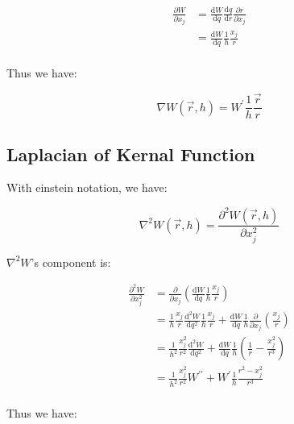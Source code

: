 \documentclass[10pt, oneside]{article}
\begin{document}
\begin{equation}
    \begin{aligned}
        \frac{\partial W}{\partial x_j}&=
        \frac{\mathrm{d} W}{\mathrm{d} q}\frac{\mathrm{d} q}{\mathrm{d} r}\frac{\partial r}{\partial x_j}\\
        &=\frac{\mathrm{d} W}{\mathrm{d} q}\frac{1}{h}\frac{x_j}{r}\\
    \end{aligned}
\end{equation}

Thus we have:

\begin{equation}
    \nabla W(\vec{r}, h) = W^\prime \frac{1}{h} \frac{\vec{r}}{r}
\end{equation}

\subsection{Laplacian of Kernal Function}

With einstein notation, we have:

\begin{equation}
    \nabla^2 W(\vec{r}, h) = \frac{\partial^2 W(\vec{r},h)}{\partial x_j^2}
\end{equation}

$\nabla^2 W$'s component is:

\begin{equation}
    \begin{aligned}
        \frac{\partial^2 W}{\partial x_j^2}&=\frac{\partial}{\partial x_j}
        \left(
            \frac{\mathrm{d} W}{\mathrm{d} q}\frac{1}{h}\frac{x_j}{r}
        \right)\\
        &=\frac{1}{h}\frac{x_j}{r}\frac{\mathrm{d}^2 W}{\mathrm{d} q^2}\frac{1}{h}\frac{x_j}{r}+
        \frac{\mathrm{d} W}{\mathrm{d} q}\frac{1}{h}\frac{\partial}{\partial x_j}\left(\frac{x_j}{r}\right)\\
        &=\frac{1}{h^2}\frac{x_j^2}{r^2}\frac{\mathrm{d}^2 W}{\mathrm{d} q^2}+
        \frac{\mathrm{d} W}{\mathrm{d} q}\frac{1}{h}\left(\frac{1}{r}-\frac{x_j^2}{r^3}\right)\\
        &=\frac{1}{h^2}\frac{x_j^2}{r^2}W^{\prime\prime}+
        W^\prime\frac{1}{h}\frac{r^2-x_j^2}{r^3}\\
    \end{aligned}
\end{equation}

Thus we have:
\end{document}
